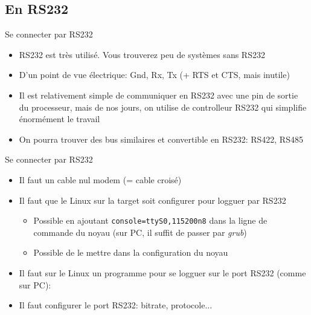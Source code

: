 \subsection{En RS232}

\begin{frame}{Se connecter par RS232}
  \begin{itemize}
  \item RS232  est très utilisé.  Vous trouverez peu de  systèmes sans
    RS232
  \item D'un point de vue électrique:  Gnd, Rx, Tx (+ RTS et CTS, mais
    inutile)
  \item Il  est relativement simple  de communiquer en RS232  avec une
    pin  de sortie du  processeur, mais  de nos  jours, on  utilise de
    controlleur RS232 qui simplifie énormément le travail
  \item On pourra trouver des  bus similaires et convertible en RS232:
    RS422, RS485
  \end{itemize}
\end{frame}

\begin{frame}{Se connecter par RS232}
  \begin{itemize}
  \item Il faut un cable nul modem (= cable croisé)
  \item  Il faut  que  le Linux  sur  la target  soit configurer  pour
    logguer par RS232
    \begin{itemize}
    \item Possible en ajoutant \texttt{console=ttyS0,115200n8} dans la
      ligne  de commande du  noyau (sur  PC, il  suffit de  passer par
      \emph{grub}) 
    \item Possible de le mettre dans la configuration du noyau
    \end{itemize}
  \item Il faut sur le Linux  un programme pour se logguer sur le port
    RS232 (comme sur PC):  
  \item Il faut configurer le port RS232: bitrate, protocole...
  \end{itemize}
\end{frame}

